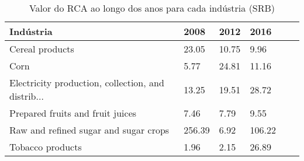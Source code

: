 \begin{table}
\centering
\caption{Valor do RCA ao longo dos anos para cada indústria (SRB)}
\label{tab:ex3-tempo-SRB}
\begin{tabular}{p{6cm}p{1.5cm}p{1.5cm}p{1.5cm}p{1.5cm}p{1.5cm}}
\toprule
                                         Indústria &   2008 &  2012 &   2016 \\
\midrule
                                   Cereal products &  23.05 & 10.75 &   9.96 \\
                                              Corn &   5.77 & 24.81 &  11.16 \\
Electricity production, collection, and distrib... &  13.25 & 19.51 &  28.72 \\
                  Prepared fruits and fruit juices &   7.46 &  7.79 &   9.55 \\
             Raw and refined sugar and sugar crops & 256.39 &  6.92 & 106.22 \\
                                  Tobacco products &   1.96 &  2.15 &  26.89 \\
\bottomrule
\end{tabular}
\end{table}
